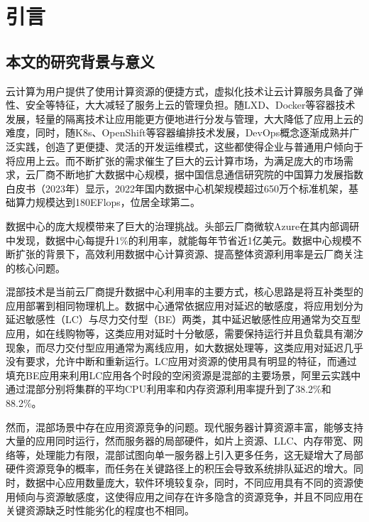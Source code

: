 \chapter{引言}\label{chap:introduction}

\section{本文的研究背景与意义}


云计算为用户提供了使用计算资源的便捷方式，虚拟化技术让云计算服务具备了弹性、安全等特征，大大减轻了服务上云的管理负担。随LXD、Docker等容器技术发展，轻量的隔离技术让应用能更方便地进行分发与管理，大大降低了应用上云的难度，同时，随K8s、OpenShift等容器编排技术发展，DevOps概念逐渐成熟并广泛实践，创造了更便捷、灵活的开发运维模式，这些都使得企业与普通用户倾向于将应用上云。而不断扩张的需求催生了巨大的云计算市场，为满足庞大的市场需求，云厂商不断地扩大数据中心规模，据中国信息通信研究院的中国算力发展指数白皮书（2023年）显示，2022年国内数据中心机架规模超过650万个标准机架，基础算力规模达到180EFlops，位居全球第二\citep{chinaict2023}。

数据中心的庞大规模带来了巨大的治理挑战。头部云厂商微软Azure在其内部调研中发现，数据中心每提升1\%的利用率，就能每年节省近1亿美元\citep{hadary2020protean}。数据中心规模不断扩张的背景下，高效利用数据中心计算资源、提高整体资源利用率是云厂商关注的核心问题。

混部技术是当前云厂商提升数据中心利用率的主要方式，核心思路是将互补类型的应用部署到相同物理机上。数据中心通常依据应用对延迟的敏感度，将应用划分为延迟敏感性（LC）与尽力交付型（BE）两类，其中延迟敏感性应用通常为交互型应用，如在线购物等，这类应用对延时十分敏感，需要保持运行并且负载具有潮汐现象，而尽力交付型应用通常为离线应用，如大数据处理等，这类应用对延迟几乎没有要求，允许中断和重新运行。LC应用对资源的使用具有明显的特征，而通过填充BE应用来利用LC应用各个时段的空闲资源是混部的主要场景，阿里云实践中通过混部分别将集群的平均CPU利用率和内存资源利用率提升到了38.2\%和88.2\%\citep{guo2019limits}。

然而，混部场景中存在应用资源竞争的问题。现代服务器计算资源丰富，能够支持大量的应用同时运行，然而服务器的局部硬件，如片上资源、LLC、内存带宽、网络等，处理能力有限，混部试图向单一服务器上引入更多任务，这无疑增大了局部硬件资源竞争的概率，而任务在关键路径上的积压会导致系统排队延迟的增大。同时，数据中心应用数量庞大，软件环境较复杂，同时，不同应用具有不同的资源使用倾向与资源敏感度，这使得应用之间存在许多隐含的资源竞争，并且不同应用在关键资源缺乏时性能劣化的程度也不相同。

